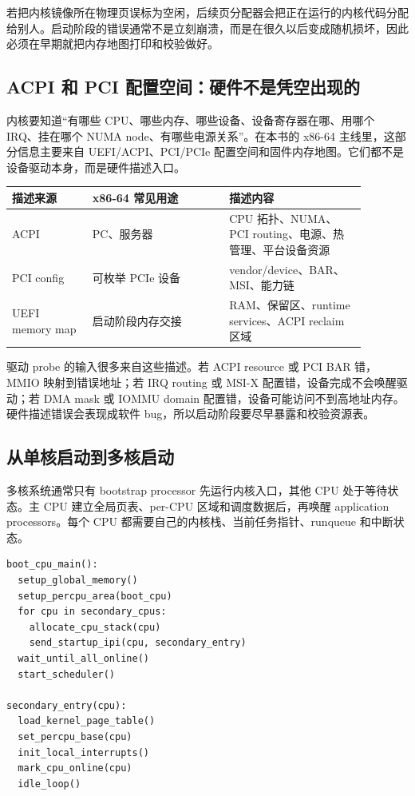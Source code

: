 若把内核镜像所在物理页误标为空闲，后续页分配器会把正在运行的内核代码分配给别人。启动阶段的错误通常不是立刻崩溃，而是在很久以后变成随机损坏，因此必须在早期就把内存地图打印和校验做好。

\subsection{ACPI 和 PCI 配置空间：硬件不是凭空出现的}

内核要知道“有哪些 CPU、哪些内存、哪些设备、设备寄存器在哪、用哪个 IRQ、挂在哪个 NUMA node、有哪些电源关系”。在本书的 x86-64 主线里，这部分信息主要来自 UEFI/ACPI、PCI/PCIe 配置空间和固件内存地图。它们都不是设备驱动本身，而是硬件描述入口。

\begin{longtable}{p{0.2\linewidth}p{0.34\linewidth}p{0.34\linewidth}}
\toprule
描述来源 & x86-64 常见用途 & 描述内容 \\
\midrule
ACPI & PC、服务器 & CPU 拓扑、NUMA、PCI routing、电源、热管理、平台设备资源 \\
PCI config & 可枚举 PCIe 设备 & vendor/device、BAR、MSI、能力链 \\
UEFI memory map & 启动阶段内存交接 & RAM、保留区、runtime services、ACPI reclaim 区域 \\
\bottomrule
\end{longtable}

驱动 probe 的输入很多来自这些描述。若 ACPI resource 或 PCI BAR 错，MMIO 映射到错误地址；若 IRQ routing 或 MSI-X 配置错，设备完成不会唤醒驱动；若 DMA mask 或 IOMMU domain 配置错，设备可能访问不到高地址内存。硬件描述错误会表现成软件 bug，所以启动阶段要尽早暴露和校验资源表。

\subsection{从单核启动到多核启动}

多核系统通常只有 bootstrap processor 先运行内核入口，其他 CPU 处于等待状态。主 CPU 建立全局页表、per-CPU 区域和调度数据后，再唤醒 application processors。每个 CPU 都需要自己的内核栈、当前任务指针、runqueue 和中断状态。

\begin{lstlisting}
boot_cpu_main():
  setup_global_memory()
  setup_percpu_area(boot_cpu)
  for cpu in secondary_cpus:
    allocate_cpu_stack(cpu)
    send_startup_ipi(cpu, secondary_entry)
  wait_until_all_online()
  start_scheduler()

secondary_entry(cpu):
  load_kernel_page_table()
  set_percpu_base(cpu)
  init_local_interrupts()
  mark_cpu_online(cpu)
  idle_loop()
\end{lstlisting}

